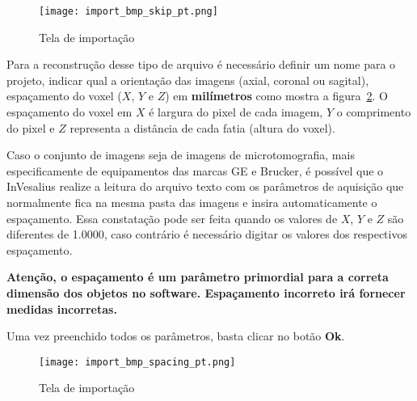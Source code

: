 \begin{figure}[!htb]
\centering
\texttt{[image: import\_bmp\_skip\_pt.png]}
\caption{Tela de importação}
\label{fig:import_bmp_skip_pt}
\end{figure}

Para a reconstrução desse tipo de arquivo é necessário definir um nome para o projeto, indicar qual a orientação das imagens (axial, coronal ou sagital), espaçamento do voxel ($X$, $Y$ e $Z$) em \textbf{milímetros} como mostra a figura~\ref{fig:import_bmp_spacing_pt}. O espaçamento do voxel em $X$ é largura do pixel de cada imagem, $Y$ o comprimento do pixel e $Z$ representa a distância de cada fatia (altura do voxel). 

Caso o conjunto de imagens seja de imagens de microtomografia, mais especificamente de equipamentos das marcas GE e Brucker, é possível que o InVesalius realize a leitura do arquivo texto com os parâmetros de aquisição que normalmente fica na mesma pasta das imagens e insira automaticamente o espaçamento. Essa constatação pode ser feita quando os valores de $X$, $Y$ e $Z$ são diferentes de 1.0000, caso contrário é necessário digitar os valores dos respectivos espaçamento. 

\textbf{Atenção, o espaçamento é um parâmetro primordial para a correta dimensão dos objetos no software. Espaçamento incorreto irá fornecer medidas incorretas.}

Uma vez preenchido todos os parâmetros, basta clicar no botão \textbf{Ok}.

\begin{figure}[!htb]
\centering
\texttt{[image: import\_bmp\_spacing\_pt.png]}
\caption{Tela de importação}
\label{fig:import_bmp_spacing_pt}
\end{figure}